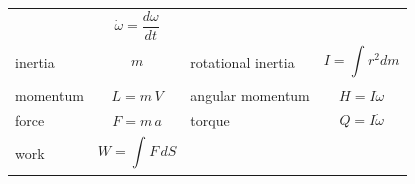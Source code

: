 \documentclass[
]{book}
\begin{document}
\begin{longtable}[]{@{}llll@{}}
\begin{minipage}[t]{0.19\columnwidth}
\end{minipage} & \begin{minipage}[t]{0.31\columnwidth}\raggedright
\[\dot{\omega} = \frac{d\omega}{dt}\]\strut
\end{minipage}\tabularnewline
\begin{minipage}[t]{0.17\columnwidth}\raggedright
inertia\strut
\end{minipage} & \begin{minipage}[t]{0.21\columnwidth}\raggedright
\[m\]\strut
\end{minipage} & \begin{minipage}[t]{0.19\columnwidth}\raggedright
rotational inertia\strut
\end{minipage} & \begin{minipage}[t]{0.31\columnwidth}\raggedright
\[I = \int_{}^{}{r^2 dm}\]\strut
\end{minipage}\tabularnewline
\begin{minipage}[t]{0.17\columnwidth}\raggedright
momentum\strut
\end{minipage} & \begin{minipage}[t]{0.21\columnwidth}\raggedright
\[L = m\,V\]\strut
\end{minipage} & \begin{minipage}[t]{0.19\columnwidth}\raggedright
angular momentum\strut
\end{minipage} & \begin{minipage}[t]{0.31\columnwidth}\raggedright
\[H = I \omega\]\strut
\end{minipage}\tabularnewline
\begin{minipage}[t]{0.17\columnwidth}\raggedright
force\strut
\end{minipage} & \begin{minipage}[t]{0.21\columnwidth}\raggedright
\[F = m\,a\]\strut
\end{minipage} & \begin{minipage}[t]{0.19\columnwidth}\raggedright
torque\strut
\end{minipage} & \begin{minipage}[t]{0.31\columnwidth}\raggedright
\[Q = I \dot{\omega}\]\strut
\end{minipage}\tabularnewline
\begin{minipage}[t]{0.17\columnwidth}\raggedright
work\strut
\end{minipage} & \begin{minipage}[t]{0.21\columnwidth}\raggedright
\[W = \int_{}^{}{F\,dS}\]\strut
\end{minipage} & \begin{minipage}[t]{0.19\columnwidth}\raggedright

\end{minipage}
\end{longtable}
\end{document}
